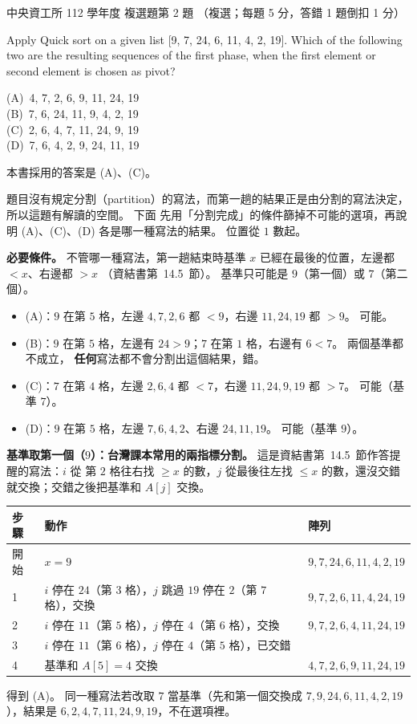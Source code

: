 \begin{pastexam}[label={px:ncu-112-dsa-02}]{中央資工所 112 學年度 複選題第 2 題}
（複選；每題 5 分，答錯 1 題倒扣 1 分）

Apply Quick sort on a given list [9, 7, 24, 6, 11, 4, 2, 19]. Which of the following two are the
resulting sequences of the first phase, when the first element or second element is chosen as pivot?

(A)~4, 7, 2, 6, 9, 11, 24, 19\\
(B)~7, 6, 24, 11, 9, 4, 2, 19\\
(C)~2, 6, 4, 7, 11, 24, 9, 19\\
(D)~7, 6, 4, 2, 9, 24, 11, 19
\end{pastexam}

\begin{pastsoln}
本書採用的答案是 (A)、(C)。

題目沒有規定分割（partition）的寫法，而第一趟的結果正是由分割的寫法決定，所以這題有解讀的空間。 下面
先用「分割完成」的條件篩掉不可能的選項，再說明 (A)、(C)、(D) 各是哪一種寫法的結果。 位置從 $1$ 數起。

\textbf{必要條件。} 不管哪一種寫法，第一趟結束時基準 $x$ 已經在最後的位置，左邊都 $< x$、右邊都 $> x$
（資結書第~14.5~節）。 基準只可能是 $9$（第一個）或 $7$（第二個）。
\begin{itemize}
\item (A)：$9$ 在第 $5$ 格，左邊 $4, 7, 2, 6$ 都 $< 9$，右邊 $11, 24, 19$ 都 $> 9$。 可能。
\item (B)：$9$ 在第 $5$ 格，左邊有 $24 > 9$；$7$ 在第 $1$ 格，右邊有 $6 < 7$。 兩個基準都不成立，
\textbf{任何}寫法都不會分割出這個結果，錯。
\item (C)：$7$ 在第 $4$ 格，左邊 $2, 6, 4$ 都 $< 7$，右邊 $11, 24, 9, 19$ 都 $> 7$。 可能（基準 $7$）。
\item (D)：$9$ 在第 $5$ 格，左邊 $7, 6, 4, 2$、右邊 $24, 11, 19$。 可能（基準 $9$）。
\end{itemize}

\textbf{基準取第一個（$9$）：台灣課本常用的兩指標分割。} 這是資結書第~14.5~節作答提醒的寫法：$i$ 從
第 $2$ 格往右找 $\ge x$ 的數，$j$ 從最後往左找 $\le x$ 的數，還沒交錯就交換；交錯之後把基準和 $A[j]$
交換。
\begin{center}
\small
\begin{tabular}{lll}
\toprule
步驟 & 動作 & 陣列 \\
\midrule
開始 & $x = 9$ & $9, 7, 24, 6, 11, 4, 2, 19$ \\
1 & $i$ 停在 $24$（第 $3$ 格），$j$ 跳過 $19$ 停在 $2$（第 $7$ 格），交換 & $9, 7, 2, 6, 11, 4, 24, 19$ \\
2 & $i$ 停在 $11$（第 $5$ 格），$j$ 停在 $4$（第 $6$ 格），交換 & $9, 7, 2, 6, 4, 11, 24, 19$ \\
3 & $i$ 停在 $11$（第 $6$ 格），$j$ 停在 $4$（第 $5$ 格），已交錯 & \\
4 & 基準和 $A[5] = 4$ 交換 & $4, 7, 2, 6, 9, 11, 24, 19$ \\
\bottomrule
\end{tabular}
\end{center}
得到 (A)。 同一種寫法若改取 $7$ 當基準（先和第一個交換成 $7, 9, 24, 6, 11, 4, 2, 19$），結果是
$6, 2, 4, 7, 11, 24, 9, 19$，不在選項裡。


\end{pastsoln}
